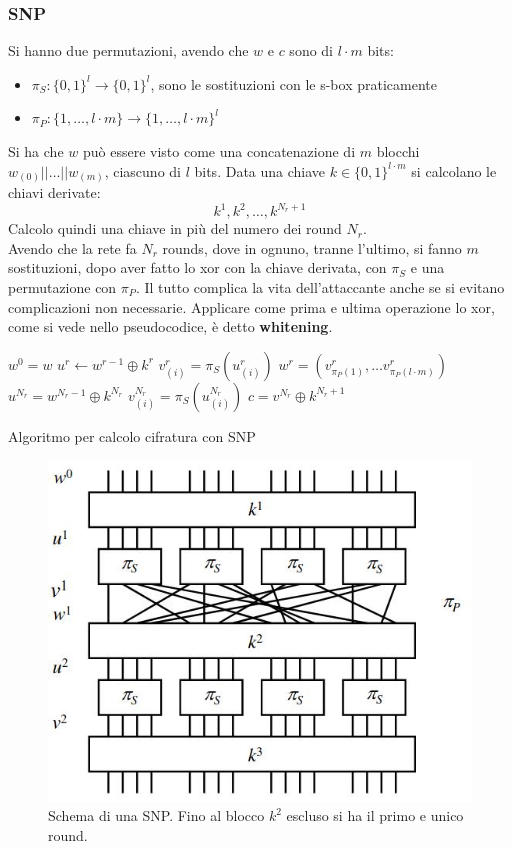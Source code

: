\documentclass[a4paper,12pt, oneside]{book}
\begin{document}
\subsubsection{SNP}
Si hanno due permutazioni, avendo che $w$ e $c$ sono di $l\cdot m$ bits:
\begin{itemize}
  \item $\pi_S:\{0,1\}^l\to\{0,1\}^l$, sono le sostituzioni con le s-box
  praticamente 
  \item $\pi_P:\{1,\ldots, l\cdot m\}\to\{1,\ldots, l\cdot m\}^l$
\end{itemize}
Si ha che $w$ può essere visto come una concatenazione di $m$ blocchi
$w_{(0)}||\ldots || w_{(m)}$, ciascuno di $l$ bits. Data una chiave $k\in
\{0,1\}^{l\cdot m}$ si calcolano le chiavi derivate:
\[k^1,k^2,\ldots, k^{N_r+1}\]
Calcolo quindi una chiave in più del numero dei round $N_r$.\\
Avendo che la rete fa $N_r$ rounds, dove in ognuno, tranne l'ultimo, si fanno
$m$ sostituzioni, dopo aver fatto lo xor con la chiave derivata, con $\pi_S$ e
una permutazione con $\pi_P$. Il tutto complica la vita dell'attaccante anche se
si evitano complicazioni non necessarie. Applicare come prima e ultima
operazione lo xor, come si vede nello pseudocodice, è detto \textbf{whitening}.
\begin{algorithm}
  \begin{algorithmic}
    \State $w^0=w$
    \State $u^r\gets w^{r-1}\oplus k^r$
    \EndFor
    \State $v_{(i)}^r=\pi_S(u^r_{(i)})$
    \State $w^r=(v^r_{\pi_P(1)},\ldots v^r_{\pi_P(l\cdot m)})$
    \EndFor
    \State $u^{N_r}=w^{N_r-1}\oplus k^{N_r}$
    \State $v_{(i)}^{N_r}=\pi_S(u^{N_r}_{(i)})$
    \EndFor
    \State $c=v^{N_r}\oplus k^{N_r+1}$
    \EndFunction
  \end{algorithmic}
  \caption{Algoritmo per calcolo cifratura con SNP}
\end{algorithm}
\begin{figure}
  \centering
  \includegraphics[scale = 0.45]{img/snp.jpg}
  \caption{Schema di una SNP. Fino al blocco $k^2$ escluso si ha il
    primo e unico round.}
  \label{fig:spn}
\end{figure}
\end{document}
